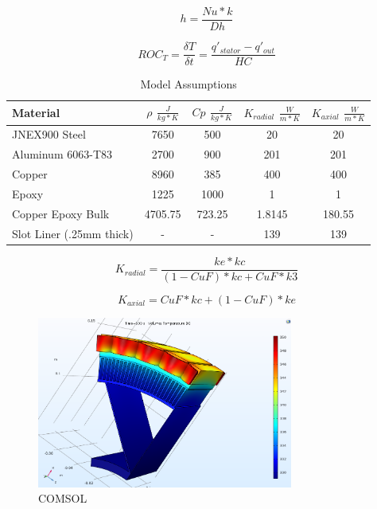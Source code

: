 \documentclass[]{aiaa-tc}%
\begin{document}
\begin{equation}
h = \frac{Nu*k}{Dh}
\label{eq:h}
\end{equation}

\begin{equation}
ROC_{T} = \frac{\delta T}{\delta t} = \frac{q'_{stator}-q'_{out}}{HC}
\label{eq:ROC}
\end{equation}

\begin{table}[hbt!]
\caption{\label{tab:COMSOL} Model Assumptions}
\centering
\begin{tabular}{lcccc}
Material  & $\rho$ $\frac{J}{kg*K}$ & $Cp$ $\frac{J}{kg*K}$  & $K_{radial}$ $\frac{W}{m*K}$ & $K_{axial}$ $\frac{W}{m*K}$\\\hline
JNEX900 Steel & 7650& 500& 20& 20\\
Aluminum 6063-T83   & 2700  & 900 & 201& 201  \\
Copper & 8960 & 385 & 400& 400\\
Epoxy & 1225 & 1000 & 1& 1 \\
Copper Epoxy Bulk & 4705.75 & 723.25 & 1.8145 & 180.55\\
Slot Liner (.25mm thick) &-&-&139 & 139\\\hline
\end{tabular}
\end{table}

\begin{equation}
K_{radial} = \frac{ke*kc}{(1-CuF)*kc + CuF*k3}
\label{eq:kradial}
\end{equation}

\begin{equation}
K_{axial} = CuF*kc + (1-CuF)*ke
\label{eq:kaxial}
\end{equation}

\begin{figure}[!htb]%
	\centering
	\includegraphics[width=0.75\textwidth]{figures/jmx57_motor_comsol.png}
	\caption{COMSOL}
	\label{fig:comsol}
\end{figure}
\end{document}
